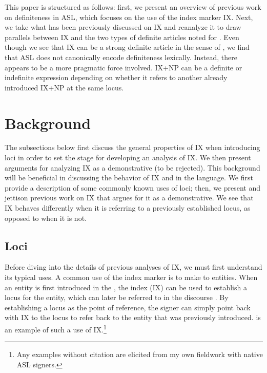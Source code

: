\documentclass[output=paper,
modfonts
]{langscibook}
\begin{document}
This paper is structured as follows: first, we present an overview of previous work on definiteness in ASL, which focuses on the use of the index marker IX. Next, we take what has been previously discussed on IX and reanalyze it to draw parallels between IX and the two types of definite articles noted for  \citep{Jenks2015}. Even though we see that IX can be a strong definite article in the sense of \citet{Schwarz2009}, we find that ASL does not canonically encode definiteness lexically. Instead, there appears to be a more pragmatic force involved. IX+NP can be a definite or indefinite expression depending on whether it refers to another already introduced IX+NP at the same locus.  

\section{Background}\label{sec:irani:2}

The subsections below first discuss the general properties of IX when introducing loci in order to set the stage for developing an analysis of IX. We then present arguments for analyzing IX as a demonstrative (to be rejected). This background will be beneficial in discussing the behavior of IX and  in the language. We first provide a description of some commonly known uses of loci; then, we present and jettison previous work on IX that argues for it as a demonstrative. We see that IX behaves differently when it is referring to a previously established locus, as opposed to when it is not.

\subsection{Loci}

Before diving into the details of previous analyses of IX, we must first understand its typical uses. A common use of the index marker is to make  to entities. When an entity is first introduced in the , the index (IX) can be used to establish a locus for the entity, which can later be referred to in the discourse \citep{KlimaBellugi1979,LilloMartinKlima1990}. By establishing a locus as the point of reference, the signer can simply point back with IX to the locus to refer back to the entity that was previously introduced.  is an example of such a use of IX.\footnote{Any examples without citation are elicited from my own fieldwork with native ASL signers.}
\end{document}
